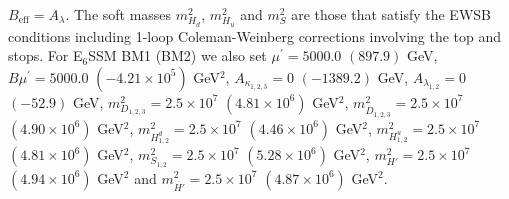 \documentclass[preprint,amsmath,amssymb,aps,superscriptaddress,prd,showpacs,floatfix,nofootinbib]{revtex4-1}
\begin{document}
\begin{table}[h]
{$B_{\mathrm{eff}}=A_\lambda$. The soft masses $m_{H_d}^2$, $m_{H_u}^2$ and $m_S^2$ are those that satisfy the EWSB conditions including 1-loop Coleman-Weinberg corrections involving the top and stops. For E$_6$SSM BM1 (BM2) we also set $\mu^\prime = 5000.0$ $(897.9)$ GeV, $B\mu^\prime = 5000.0$ $(-4.21\times 10^5)$ GeV$^2$, $A_{\kappa_{1,2,3}} = 0$ $(-1389.2)$ GeV, $A_{\lambda_{1,2}} = 0$ $(-52.9)$ GeV, $m_{D_{1,2,3}}^2 = 2.5\times 10^7$ $(4.81\times 10^6)$ GeV$^2$, $m_{\overline{D}_{1,2,3}}^2 = 2.5\times 10^7$ $(4.90\times 10^6)$ GeV$^2$, $m_{H^d_{1,2}}^2 = 2.5\times 10^7$ $(4.46\times 10^6)$ GeV$^2$, $m_{H^u_{1,2}}^2 = 2.5\times 10^7$ $(4.81\times 10^6)$ GeV$^2$, $m_{S_{1,2}}^2 = 2.5\times 10^7$ $(5.28\times 10^6)$ GeV$^2$, $m_{H'}^2 = 2.5\times 10^7$ $(4.94\times 10^6)$ GeV$^2$ and $m_{\overline{H'}}^2 = 2.5\times 10^7$ $(4.87\times 10^6)$ GeV$^2$.
}
\label{tab:benchmarks}
\end{table}
\endgroup
\end{document}
